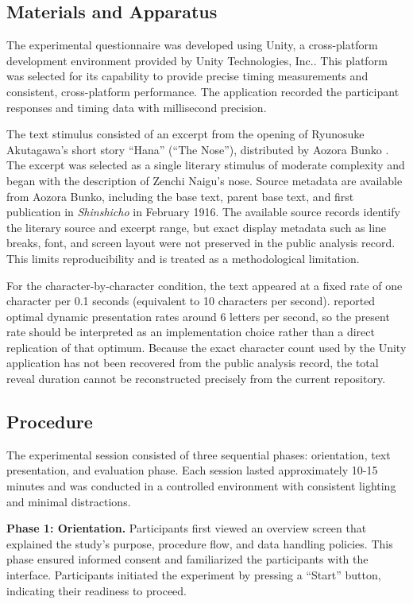 \documentclass[authoryear]{elsarticle}
\begin{document}
\subsection{Materials and Apparatus}
The experimental questionnaire was developed using Unity, a cross-platform development environment provided by Unity Technologies, Inc.. This platform was selected for its capability to provide precise timing measurements and consistent, cross-platform performance. The application recorded the participant responses and timing data with millisecond precision.

The text stimulus consisted of an excerpt from the opening of Ryunosuke Akutagawa's short story ``Hana'' (``The Nose''), distributed by Aozora Bunko \citep{akutagawa_aozora_hana}. The excerpt was selected as a single literary stimulus of moderate complexity and began with the description of Zenchi Naigu's nose. Source metadata are available from Aozora Bunko, including the base text, parent base text, and first publication in \textit{Shinshicho} in February 1916. The available source records identify the literary source and excerpt range, but exact display metadata such as line breaks, font, and screen layout were not preserved in the public analysis record. This limits reproducibility and is treated as a methodological limitation.

For the character-by-character condition, the text appeared at a fixed rate of one character per 0.1 seconds (equivalent to 10 characters per second). \citet{uetsuki2017} reported optimal dynamic presentation rates around 6 letters per second, so the present rate should be interpreted as an implementation choice rather than a direct replication of that optimum. Because the exact character count used by the Unity application has not been recovered from the public analysis record, the total reveal duration cannot be reconstructed precisely from the current repository.

\subsection{Procedure}
The experimental session consisted of three sequential phases: orientation, text presentation, and evaluation phase. Each session lasted approximately 10-15 minutes and was conducted in a controlled environment with consistent lighting and minimal distractions.

\textbf{Phase 1: Orientation.} Participants first viewed an overview screen that explained the study’s purpose, procedure flow, and data handling policies. This phase ensured informed consent and familiarized the participants with the interface. Participants initiated the experiment by pressing a ``Start'' button, indicating their readiness to proceed.
\end{document}
